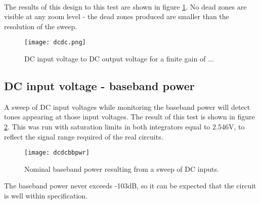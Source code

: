         \begin{align}
            
        \end{align}

        The results of this design to this test are shown in figure \ref{fig:dcdc}.
        No dead zones are visible at any zoom level - the dead zones produced are smaller than the resolution of the sweep.

        \begin{figure}
            \begin{center}
            \texttt{[image: dcdc.png]}
            \label{fig:dcdc}
            \caption{DC input voltage to DC output voltage for a finite gain of ...} %
            \end{center}
        \end{figure}       

        \subsection{DC input voltage - baseband power}
        \label{Verification:DCbbpwr}
        A sweep of DC input voltages while monitoring the baseband power will detect tones appearing at those input voltages.
        The result of this test is shown in figure \ref{fig:dcdcbbpwr}.
        This was run with saturation limits in both integrators equal to 2.546V, to reflect the signal range required of the real circuits.

         \begin{figure}
            \begin{center}
            \texttt{[image: dcdcbbpwr]}
            \label{fig:dcdcbbpwr}
            \caption{Nominal baseband power resulting from a sweep of DC inputs.}
            \end{center}
        \end{figure}       
        
        The baseband power never exceeds -103dB, so it can be expected that the circuit is well within specification.


